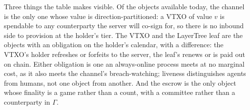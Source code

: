\documentclass[11pt]{article}
\theoremstyle{plain}
\theoremstyle{definition}
\theoremstyle{remark}
\begin{document}
Three things the table makes visible. Of the objects available today, the channel is the only one whose value is direction-partitioned: a VTXO of value $v$ is spendable to any counterparty the server will co-sign for, so there is no inbound side to provision at the holder's tier. The VTXO and the LayerTree leaf are the objects with an obligation on the holder's calendar, with a difference: the VTXO's holder refreshes or forfeits to the server, the leaf's renews or is paid out on chain. Either obligation is one an always-online process meets at no marginal cost, as it also meets the channel's breach-watching; liveness distinguishes agents from humans, not one object from another. And the escrow is the only object whose finality is a game rather than a count, with a committee rather than a counterparty in $\Gamma$.
\end{document}
